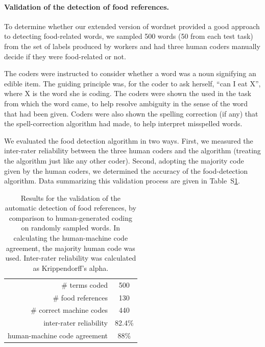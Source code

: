 \documentclass[12pt]{article}
\begin{document}
\paragraph{Validation of the detection of food references.}
To determine whether our extended version of wordnet provided a good approach
to detecting food-related words, we sampled 500 words 
(50 from each test task)  from the set of labels produced by workers and had 
three human coders manually decide if they were 
food-related or not.

The coders were instructed to consider whether a word was a noun signifying
an edible item.  The guiding principle was, for the coder to ask herself,
``can I eat X'', where X is the word she is coding.  The coders were
shown the used in the task from which the word came, to help resolve ambiguity
in the sense of the word that had been given.  Coders were also shown the 
spelling correction (if any) that the spell-correction algorithm had made,
to help interpret misspelled words.

We evaluated the food detection algorithm in two ways.  First, we measured
the inter-rater reliability between the three human coders and the algorithm
(treating the algorithm just like any other coder).  Second, adopting the 
majority code given by the human coders, we determined the accuracy of the
food-detection algorithm.  Data summarizing this validation process are given
in Table~S\ref{table:inter-rater}.

\begin{table}
\centering
\setlength{\tabcolsep}{12pt}
\begin{tabular}{ r | c }
\toprule    
\# terms coded & 500 \\
\# food references & 130 \\
\# correct machine codes & 440 \\
inter-rater reliability & 82.4\% \\
human-machine code agreement & 88\% \\
\bottomrule
\end{tabular}
\caption{
	Results for the validation 
	of the automatic detection of food references, by comparison to
	human-generated coding on randomly sampled words.  In calculating the 
	human-machine code agreement, the majority human code was used.
	Inter-rater reliability was calculated as Krippendorff's alpha.
}
\label{table:inter-rater}
\end{table}
\end{document}
